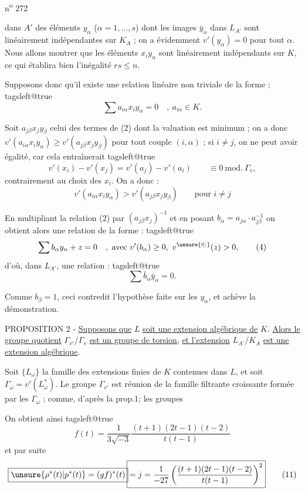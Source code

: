 n\textsuperscript{o} 272

dans $A'$ des éléments $y_\alpha$ ($\alpha=1,\ldots,s$) dont les images $\bar y_\alpha$ dans $L_{A'}$ sont linéairement indépendantes sur $K_A$ ; on a évidemment $v'(y_\alpha)=0$ pour tout $\alpha$. Nous allons montrer que les éléments $x_i y_\alpha$ sont linéairement indépendants sur $K$, ce qui établira bien l'inégalité $rs\leq n$.

Supposons donc qu'il existe une relation linéaire non triviale de la forme ;
\begingroup\csname tagsleft@true\endcsname
\[
\sum a_{i\alpha}x_i y_\alpha=0\quad,\ a_{i\alpha}\in K. \tag*{(2)}
\]
\endgroup

Soit $a_{j\beta}x_j y_\beta$ celui des termes de (2) dont la valuation est minimum ; on a donc $v'(a_{i\alpha}x_i y_\alpha)\geq v'(a_{j\beta}x_j y_\beta)$ pour tout couple $(i,\alpha)$ ; si $i\ne j$, on ne peut avoir égalité, car cela entraînerait
\begingroup\csname tagsleft@true\endcsname
\[
v'(x_i)-v'(x_j)=v'(a_j)-v'(a_i)\qquad\equiv 0\ \mathrm{mod.}\ \Gamma_v, \tag*{(3)}
\]
\endgroup
contrairement au choix des $x_i$. On a donc :
\[
v'(a_{i\alpha}x_i y_\alpha)>v'(a_{j\beta}x_j y_\beta)\qquad\text{pour } i\ne j
\]

En multipliant la relation (2) par $(a_{j\beta}x_j)^{-1}$ et en posant $b_\alpha=a_{j\alpha}\cdot a_{j\beta}^{-1}$ on obtient alors une relation de la forme :
\begingroup\csname tagsleft@true\endcsname
\[
\sum b_\alpha y_\alpha+z=0\quad,\ \text{avec }v'(b_\alpha)\geq 0,\ v^{\unsure{\prime|:}}(z)>0, \tag*{(4)}
\]
\endgroup
d'où, dans $L_{A'}$, une relation :
\begingroup\csname tagsleft@true\endcsname
\[
\sum\bar b_\alpha\bar y_\alpha=0. \tag*{(5)}
\]
\endgroup

Comme $b_\beta=1$, ceci contredit l'hypothèse faite sur les $y_\alpha$, et achève la démonstration.

PROPOSITION 2 - \uline{Supposons que} $L$ \uline{soit une extension algébrique de} $K$. \uline{Alors le groupe quotient} $\Gamma_{v'}/\Gamma_v$ \uline{est un groupe de torsion}, \uline{et l'extension} $L_{A'}/K_A$ \uline{est une extension algébrique}.

Soit $\{L_\omega\}$ la famille des extensions finies de $K$ contenues dans $L$, et soit $\Gamma_\omega=v'(L_\omega^*)$. Le groupe $\Gamma_{v'}$ est réunion de la famille filtrante croissante formée par les $\Gamma_\omega$ ; comme, d'après la prop.1; les groupes

On obtient ainsi
\begingroup\csname tagsleft@true\endcsname
\[
f(t)=\frac{1}{3\sqrt{-3}}\frac{(t+1)(2t-1)(t-2)}{t(t-1)} \tag*{(10)}
\]
\endgroup
et par suite
\[
\boxed{\unsure{\rho^*(t)|p^*(t)}=(gf)^*(t)}\!\boxed{=j=\frac{1}{-27}\left(\frac{(t+1)(2t-1)(t-2)}{t(t-1)}\right)^2} \tag*{(11)}
\]

